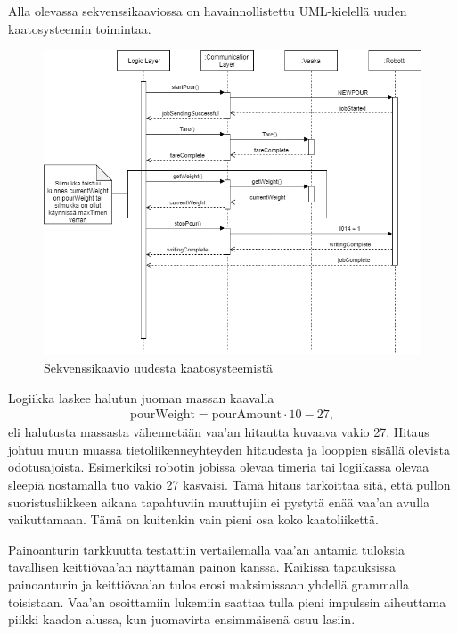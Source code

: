 Alla olevassa sekvenssikaaviossa on havainnollistettu UML-kielellä uuden kaatosysteemin toimintaa.

\begin{figure}[h]
\begin{center}
\includegraphics[scale=0.6]{img/Sequence.png}
\end{center}
\caption{Sekvenssikaavio uudesta kaatosysteemistä}
\label{fig:Sequence}
\end{figure}

Logiikka laskee halutun juoman massan kaavalla
\begin{align}
    \mathrm{pourWeight} = \mathrm{pourAmount} \cdot 10 - 27 \mathrm{,}
\end{align}
eli halutusta massasta vähennetään vaa'an hitautta kuvaava vakio 27. Hitaus johtuu muun muassa tietoliikenneyhteyden hitaudesta ja looppien sisällä olevista odotusajoista. Esimerkiksi robotin jobissa olevaa timeria tai logiikassa olevaa sleepiä nostamalla tuo vakio 27 kasvaisi. Tämä hitaus tarkoittaa sitä, että pullon suoristusliikkeen aikana tapahtuviin muuttujiin ei pystytä enää vaa'an avulla vaikuttamaan. Tämä on kuitenkin vain pieni osa koko kaatoliikettä.

Painoanturin tarkkuutta testattiin vertailemalla vaa'an antamia tuloksia tavallisen keittiövaa'an näyttämän painon kanssa. Kaikissa tapauksissa painoanturin ja keittiövaa'an tulos erosi maksimissaan yhdellä grammalla toisistaan. Vaa'an osoittamiin lukemiin saattaa tulla pieni impulssin aiheuttama piikki kaadon alussa, kun juomavirta ensimmäisenä osuu lasiin.

